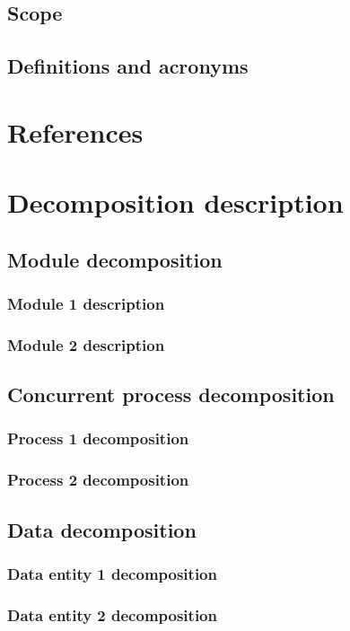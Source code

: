 \documentclass[12pt]{article}
\begin{document}
\subsection{Scope}
\subsection{Definitions and acronyms}

\section{References}

\section{Decomposition description}
\subsection{Module decomposition}
\subsubsection{Module 1 description}
\subsubsection{Module 2 description}

\subsection{Concurrent process decomposition}
\subsubsection{Process 1 decomposition}
\subsubsection{Process 2 decomposition}

\subsection{Data decomposition}
\subsubsection{Data entity 1 decomposition}
\subsubsection{Data entity 2 decomposition}
\end{document}
